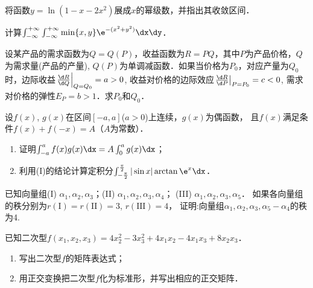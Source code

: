 \documentclass[plain,noanswer,medmath]{../../template/jnuexam}
\begin{document}

\begin{problem}
将函数$y = \ln(1 - x - 2x^2)$展成$x$的幂级数，并指出其收敛区间．
\end{problem}



\begin{problem}
计算$\int_{-\infty}^{+\infty} \int_{-\infty}^{+\infty} \min \{x,y\} \e^{- (x^2 + y^2)} \dx\dy$．
\end{problem}



\begin{problem}
设某产品的需求函数为$Q = Q(P)$，收益函数为$R = PQ$，其中$P$为产品价格，$Q$为需求量(产品的产量),
$Q(P)$为单调减函数．如果当价格为$P_0$，对应产量为$Q_0$时，边际收益$\left. \frac{\d R}{\d Q} \right|_{Q = Q_0} = a > 0$,
收益对价格的边际效应$\left. \frac{\d R}{\d P} \right|_{P = P_0} = c < 0$,
需求对价格的弹性$E_P = b > 1$．求$P_0$和$Q_0$．
\end{problem}



\begin{problem}
设$f(x)$, $g(x)$在区间$[- a,a]$($a > 0$)上连续，$g(x)$为偶函数，
且$f(x)$满足条件$f(x) + f(- x) = A$（$A$为常数）．
\begin{enumerate}
\item 证明$\int_{- a}^a f(x)g(x)\dx = A\int_0^a g(x)\dx$；
\item 利用(I)的结论计算定积分$\int_{-\frac{\pi}{2}}^{\frac{\pi}{2}}|\sin x|\arctan\e^x\dx$．
\end{enumerate}
\end{problem}



\begin{problem}
已知向量组(I) $\alpha_1,\alpha_2,\alpha_3$；(II) $\alpha_1,\alpha_2,\alpha_3,\alpha_4$；
(III) $\alpha_1,\alpha_2,\alpha_3,\alpha_5$．
如果各向量组的秩分别为$r(\textrm{I}) = r(\textrm{II}) = 3$, $r(\textrm{III}) = 4$，
证明:向量组$\alpha_1,\alpha_2,\alpha_3,\alpha_5 - \alpha_4$的秩为4.
\end{problem}



\begin{problem}
已知二次型$f(x_1,x_2,x_3) = 4x_2^2- 3x_3^2+ 4x_1x_2 - 4x_1x_3 + 8x_2x_3$．
\begin{enumerate}
\item 写出二次型$f$的矩阵表达式；
\item 用正交变换把二次型$f$化为标准形，并写出相应的正交矩阵．
\end{enumerate}
\end{problem}
\end{document}
